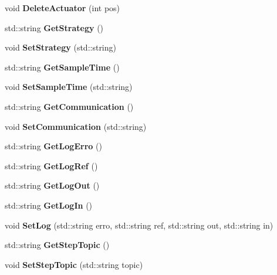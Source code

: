 \begin{DoxyCompactItemize}
\item 
void {\bfseries Delete\+Actuator} (int pos)\label{class_config_file_a0ddefc32fe2dba258c6f982bc831ca9d}

\item 
std\+::string {\bfseries Get\+Strategy} ()\label{class_config_file_afca6f07996758674008807b3a77a97a4}

\item 
void {\bfseries Set\+Strategy} (std\+::string)\label{class_config_file_a17f6e05f6f0d1deea0d914e9f7f3ce3c}

\item 
std\+::string {\bfseries Get\+Sample\+Time} ()\label{class_config_file_a64866bc52800148191db8af297ca7d61}

\item 
void {\bfseries Set\+Sample\+Time} (std\+::string)\label{class_config_file_a26d1a32273e19c7ca169c70a65d5f779}

\item 
std\+::string {\bfseries Get\+Communication} ()\label{class_config_file_abfcd8ad7c86d8981afb495e1b3e691ec}

\item 
void {\bfseries Set\+Communication} (std\+::string)\label{class_config_file_a56fb0136d04388c4afcc798c570a1c7c}

\item 
std\+::string {\bfseries Get\+Log\+Erro} ()\label{class_config_file_a2a2660e419534edb1303a2cb1fe11838}

\item 
std\+::string {\bfseries Get\+Log\+Ref} ()\label{class_config_file_a8f5d864a94e6d995f579956ac5f5952e}

\item 
std\+::string {\bfseries Get\+Log\+Out} ()\label{class_config_file_a0466bf0eb3d6d8baf33f7c80728ea097}

\item 
std\+::string {\bfseries Get\+Log\+In} ()\label{class_config_file_accdd98744c91f1fe59496ec196bc868e}

\item 
void {\bfseries Set\+Log} (std\+::string erro, std\+::string ref, std\+::string out, std\+::string in)\label{class_config_file_a342a0d0cfcc847d2774455ac1e96a154}

\item 
std\+::string {\bfseries Get\+Step\+Topic} ()\label{class_config_file_a713266fd6481572f9924a420758eaa10}

\item 
void {\bfseries Set\+Step\+Topic} (std\+::string topic)\label{class_config_file_adb00519d9c6d55ae7a60cb721969f287}


\end{DoxyCompactItemize}
